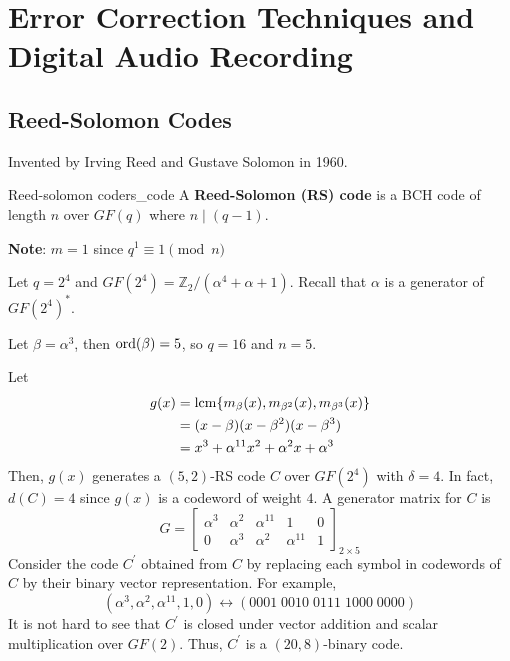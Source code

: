 \chapter{Error Correction Techniques and Digital Audio Recording}
\section{Reed-Solomon Codes}
Invented by Irving Reed and Gustave Solomon in 1960.

\begin{Definition}{Reed-solomon code}{rs_code}
    A \textbf{Reed-Solomon (RS) code} is a BCH code
    of length $ n $ over $ GF(q) $ where $ n\mid (q-1) $.

    \textbf{Note}: $ m=1 $ since $ q^1\equiv 1\pmod{n} $
\end{Definition}

\begin{Example}{}{}
    Let $ q=2^4 $ and $ GF(2^4)=\mathbb{Z}_2/(\alpha^4+\alpha+1) $.
    Recall that $ \alpha $ is a generator of $ GF(2^4)^* $.

    Let $ \beta=\alpha^3 $, then $ \operatorname{ord}(\beta)=5 $, so $ q=16 $
    and $ n=5 $.

    Let
    \begin{align*}
        g(x) & =\operatorname{lcm} \{m_{\beta}(x),m_{\beta^2}(x),m_{\beta^3}(x)\} \\
             & =(x-\beta)(x-\beta^2)(x-\beta^3)                       \\
             & =x^3+\alpha^{11}x^2+\alpha^2x+\alpha^3
    \end{align*}
    Then, $ g(x) $ generates a $ (5,2) $-RS code $ C $ over $ GF(2^4) $
    with $ \delta=4 $. In fact, $ d(C)=4 $ since $ g(x) $
    is a codeword of weight $ 4 $. A generator matrix for $ C $ is
    \[ G=
        \begin{bmatrix}
            \alpha^3 & \alpha^2 & \alpha^{11} & 1           & 0 \\
            0        & \alpha^3 & \alpha^2    & \alpha^{11} & 1
        \end{bmatrix}_{2\times 5} \]
    Consider the code $ C^{\prime} $ obtained from $ C $
    by replacing each symbol in codewords of $ C $ by their binary vector representation.
    For example,
    \[ (\alpha^3,\alpha^2,\alpha^{11},1,0)\longleftrightarrow (0001\; 0010\; 0111\; 1000\; 0000) \]
    It is not hard to see that $ C^{\prime} $ is closed under vector addition and scalar
    multiplication over $ GF(2) $. Thus, $ C^{\prime} $ is a $ (20,8) $-binary code.
\end{Example}

